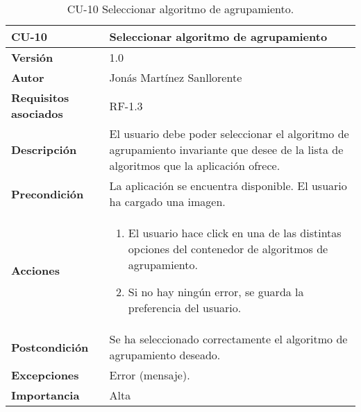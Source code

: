 \begin{table}[p]
	\centering
	\begin{tabularx}{\linewidth}{ p{} p{} }
		\toprule
		\textbf{CU-10}    & \textbf{Seleccionar algoritmo de agrupamiento}\\
		\toprule
		\textbf{Versión}              & 1.0    \\
		\textbf{Autor}                & Jonás Martínez Sanllorente \\
		\textbf{Requisitos asociados} & RF-1.3 \\
		\textbf{Descripción}          & El usuario debe poder seleccionar el algoritmo de agrupamiento invariante que desee de la lista de algoritmos que la aplicación ofrece. \\
		\textbf{Precondición}         & La aplicación se encuentra disponible.\newline
                                        El usuario ha cargado una imagen. \\
		\textbf{Acciones}             &
		\begin{enumerate}
			\def\labelenumi{\arabic{enumi}.}
			\tightlist
			\item El usuario hace click en una de las distintas opciones del contenedor de algoritmos de agrupamiento.
			\item Si no hay ningún error, se guarda la preferencia del usuario.
		\end{enumerate}\\
		\textbf{Postcondición}        & Se ha seleccionado correctamente el algoritmo de agrupamiento deseado. \\
		\textbf{Excepciones}          & Error (mensaje). \\
		\textbf{Importancia}          & Alta \\
		\bottomrule
	\end{tabularx}
	\caption{CU-10 Seleccionar algoritmo de agrupamiento.}
\end{table}

